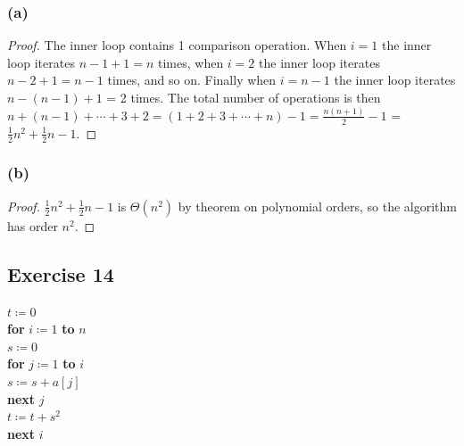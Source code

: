 \documentclass[14pt]{extarticle}
\begin{document}
\subsubsection{(a)}
\begin{proof}
The inner loop contains 1 comparison operation. When \(i = 1\) the inner loop iterates \(n-1+1 = n\) times, when \(i = 2\) 
the inner loop iterates \(n-2+1 = n-1\) times, and so on. Finally when \(i = n-1\) the inner loop iterates \(n-(n-1)+1\)
= 2 times. The total number of operations is then \(n+(n-1)+ \cdots + 3 + 2 = (1+2+3+ \cdots + n)-1 = \frac{n(n+1)}{2}-1\)
= \(\frac{1}{2}n^2 + \frac{1}{2}n - 1\).
\end{proof}

\subsubsection{(b)}
\begin{proof}
\(\frac{1}{2}n^2 + \frac{1}{2}n - 1\) is \(\Theta(n^2)\) by theorem on polynomial orders, so the algorithm has order 
\(n^2\).
\end{proof}

\subsection{Exercise 14}
\begin{tabbing}
\(t \coloneqq 0\) \\
{\bf for} \= \(i \coloneqq 1\) {\bf to} \(n\) \\
          \> \(s \coloneqq 0\) \\ 
          \> {\bf for} \= \(j \coloneqq 1\) {\bf to} \(i\)\\
          \>           \> \(s \coloneqq s + a[j]\) \\
          \> {\bf next} \(j\) \\
          \> \(t \coloneqq t + s^2\) \\
{\bf next} \(i\)
\end{tabbing}
\end{document}
